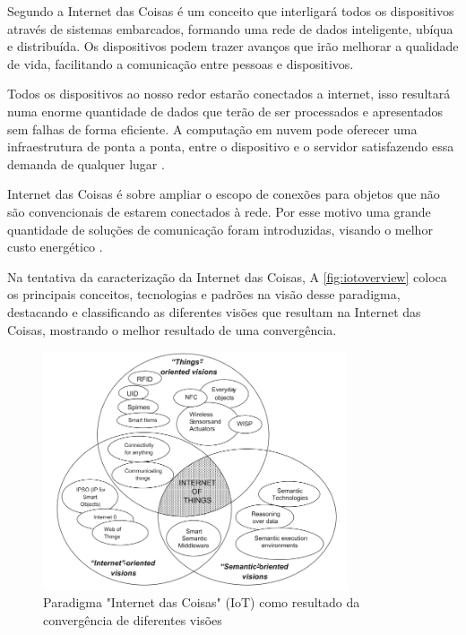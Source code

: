 Segundo \cite{xia:2012} a Internet das Coisas é um conceito que interligará todos os dispositivos através de sistemas embarcados, formando uma rede de dados inteligente, ubíqua e distribuída. Os dispositivos podem trazer avanços que irão melhorar a qualidade de vida, facilitando a comunicação entre pessoas e dispositivos.

Todos os dispositivos ao nosso redor estarão conectados a internet, isso resultará numa enorme quantidade de dados que terão de ser processados e apresentados sem falhas de forma eficiente. A computação em nuvem pode oferecer uma infraestrutura de ponta a ponta, entre o dispositivo e o servidor satisfazendo essa demanda de qualquer lugar \cite{Gubbi:2013}.

Internet das Coisas é sobre ampliar o escopo de conexões para objetos que não são convencionais de estarem conectados à rede. Por esse motivo uma grande quantidade de soluções de comunicação foram introduzidas, visando o melhor custo energético \cite{siekkinen2012low}. 

Na tentativa da caracterização da Internet das Coisas, A \autoref{fig:iotoverview} coloca os principais conceitos, tecnologias e padrões na visão desse paradigma, destacando e classificando as diferentes visões que resultam na Internet das Coisas, mostrando o melhor resultado de uma convergência.

 \begin{figure}[H]
	\centering
    	\caption{\label{fig:iotoverview} Paradigma "Internet das Coisas" (IoT) como resultado da convergência de diferentes visões }
		\includegraphics[width = 0.8\textwidth]	{resources/iotoverview}
\end{figure}

